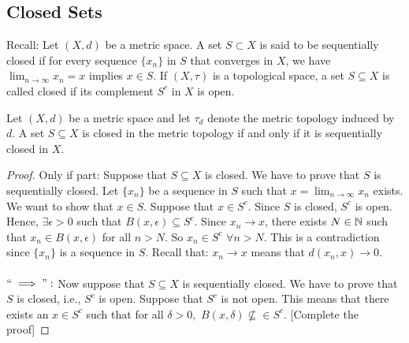 \subsection{Closed Sets}

Recall: Let $(X,d)$ be a metric space. A set $S \subset X$ is said to be sequentially closed if for every sequence $\{ x_n \}$ in $S$ that converges in $X$, we have $\lim_{n \to \infty} x_n = x$ implies $x \in S$. 
If $(X, \tau)$ is a topological space, a set $S \subseteq X$ is called closed if its complement $S^c$ in $X$ is open.

\begin{theorem}
    Let $(X,d)$ be a metric space and let $\tau_d$ denote the metric topology induced by $d$. A set $S \subseteq X$ is closed in the metric topology if and only if it is sequentially closed in $X$.
\end{theorem}
\begin{proof}
    Only if part: Suppose that $S \subseteq X$ is closed. We have to prove that $S$ is sequentially closed. Let $\{x_n \}$ be a sequence in $S$ such that $x = \lim_{n \to \infty} x_n$ exists. We want to show that  $x \in S$. Suppose that $x \in S^c$. 
    Since $S$ is closed, $S^c$ is open. Hence, $\exists \epsilon > 0$ such that $B(x, \epsilon) \subseteq S^c$. Since  $ x_n \to x$, there exists $N \in \mathbb N$ such that $x_n \in B(x, \epsilon)$ for all $n > N$. So  $x_n \in S^c$ $\forall n > N$. This is a contradiction since  $\{x_n\}$ is a sequence in $S$. Recall that:  $x_n \to x$ means that $d(x_n, x) \to 0$.
    \\
    \\
    $``\implies":$ Now suppose that $S \subseteq X$ is sequentially closed. We have to prove that $S$ is closed, i.e., $S^c$ is open. 
    Suppose that $S^c$ is not open. This means that there exists an $x \in S^c$ such that for all $\delta >0,$ $B(x, \delta) \nsubseteq \in S^c$.
    [Complete the proof]
\end{proof}


